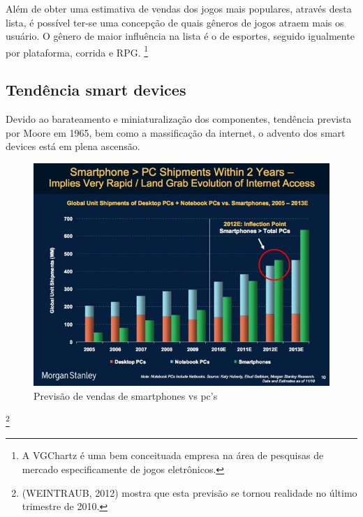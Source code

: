 \documentclass{article}
\begin{document}
Além de obter uma estimativa de vendas dos jogos mais populares, através desta lista, é possível ter-se uma concepção de quais gêneros de jogos atraem mais os usuário. O gênero de maior influência na lista é o de esportes, seguido igualmente por plataforma, corrida e RPG. 
\footnote{A VGChartz é uma bem conceituada   empresa na área de pesquisas de mercado especificamente de jogos eletrônicos.}

\subsection{Tendência smart devices}

Devido ao barateamento e miniaturalização dos componentes, tendência prevista por Moore em 1965, bem como a massificação da internet, o advento dos smart devices está em plena ascensão. 

\newpage

\begin{figure}[!htbp]
    \begin{center}
        \includegraphics[width=\textwidth]{asset/img/smartvscomputer.jpg}
               \caption{Previsão de vendas de smartphones vs pc's}
    \end{center}
\end{figure}

\footnote{(WEINTRAUB, 2012) mostra que esta previsão se tornou realidade no último trimestre de 2010.}
\end{document}
